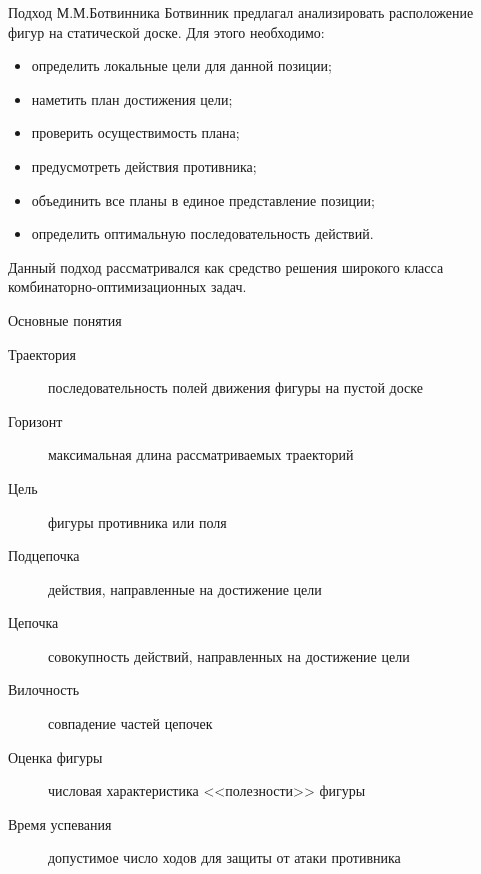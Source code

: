 \begin{frame}{Подход М.М.Ботвинника}
Ботвинник предлагал анализировать расположение фигур на статической доске. Для этого необходимо: 
\begin{itemize}
\item определить локальные цели для данной позиции;
\item наметить план достижения цели;
\item проверить осуществимость плана;
\item предусмотреть действия противника;
\item объединить все планы в единое представление позиции;
\item определить оптимальную последовательность действий.
\end{itemize}
Данный подход рассматривался как средство решения широкого класса комбинаторно-оптимизационных задач.
\end{frame}

\begin{frame}{Основные понятия}
\begin{description}
\item[Траектория] последовательность полей движения фигуры на пустой доске
\item[Горизонт] максимальная длина рассматриваемых траекторий
\item[Цель] фигуры противника или поля
\item[Подцепочка] действия, направленные на достижение цели
\item[Цепочка] совокупность действий, направленных на достижение цели
\item[Вилочность] совпадение частей цепочек
\item[Оценка фигуры] числовая характеристика <<полезности>> фигуры
\item[Время успевания] допустимое число ходов для защиты от атаки противника
\end{description}
\end{frame}

